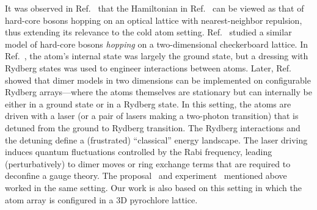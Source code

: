 \documentclass[twocolumn,superscriptaddress,amsmath,amssymb,aps,prx,nofootinbib]{revtex4-2}
\begin{document}
It was observed in Ref.~\cite{tewari2006emergence} that the Hamiltonian in Ref.~\cite{hermele2004} can be viewed as that of hard-core bosons hopping on an optical lattice with nearest-neighbor repulsion, thus extending its relevance to the cold atom setting. Ref.~\cite{glaetzle2014quantum} studied a similar model of hard-core bosons \textit{hopping} on a two-dimensional checkerboard lattice. In Ref.~\cite{glaetzle2014quantum}, the atom's internal state was largely the ground state, but a dressing with Rydberg states was used to engineer interactions between atoms. Later, Ref.~\cite{celi2020emerging} showed that dimer models in two dimensions can be implemented on configurable Rydberg arrays---where the atoms themselves are stationary but can internally be either in a ground state or in a Rydberg state. In this setting, the atoms are driven with a laser (or a pair of lasers making a two-photon transition) that is detuned from the ground to Rydberg transition. The Rydberg interactions and the detuning define a (frustrated) ``classical'' energy landscape. The laser driving induces quantum fluctuations controlled by the Rabi frequency, leading (perturbatively) to dimer moves or ring exchange terms that are required to deconfine a gauge theory. The proposal~\cite{verresen2021} and experiment~\cite{semeghini2021} mentioned above worked in the same setting. Our work is also based on this setting in which the atom array is configured in a 3D pyrochlore lattice.
\end{document}
